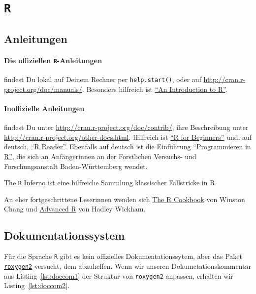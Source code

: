 \documentclass[twoside]{scrreprt}
\providecommand{\R}{\texttt{R}}
\providecommand{\code}[1]{\texttt{#1}}
\providecommand{\BW}{Baden-W\"urttemberg}
\providecommand{\FVA}[1]{Forstliche#1 Versuchs- und Forschungs\-anstalt}
\providecommand{\FVABW}[1]{\FVA{#1} \BW{}}
\begin{document}
\section{\R{}}
\subsection{Anleitungen }
\paragraph{Die offiziellen  \R{}-Anleitungen} findest Du lokal auf Deinem Rechner per
\code{help.start()}, oder auf \url{http://cran.r-project.org/doc/manuals/}.
Besonders hilfreich ist
\linebreak{}
\href{http://cran.r-project.org/doc/manuals/r-release/R-intro.pdf}
{"`An Introduction to R"'}.

\paragraph{Inoffizielle Anleitungen} findest Du unter
\url{http://cran.r-project.org/doc/contrib/}, ihre Beschreibung unter
\url{http://cran.r-project.org/other-docs.html}. Hilfreich ist
\href{http://cran.r-project.org/doc/contrib/Paradis-rdebuts_en.pdf}
{"`R for Beginners"'}
und, auf deutsch,
\href{http://cran.r-project.org/doc/contrib/Grosz+Peters-R-Reader.pdf}
{"`R Reader"'}.
Ebenfalls auf deutsch ist die Einf\"u{}hrung  
\href{http://fvafrcu.github.com/programmieren_in_r}
{"`Programmieren in R"'}, die sich an Anf\"a{}ngerinnen an der \FVABW{n} wendet. 


\href{http://www.burns-stat.com/pages/Tutor/R_inferno.pdf}{The \R{} Inferno} ist
eine hilfreiche Sammlung klassischer Fallstricke in R.

An eher fortgeschrittene Leserinnen wenden sich 
\href{http://www.cookbook-r.com/}{The R Cookbook} von Winston Chang und 
\href{http://adv-r.had.co.nz/}{Advanced R} von Hadley Wickham.


\subsection{Dokumentationssystem}
F\"u{}r die Sprache \R{}
gibt es kein offizielles Dokumentationssytem, aber
das Paket \href{http://cran.r-project.org/web/packages/roxygen2/index.html}
{\code{roxygen2}} versucht, dem abzuhelfen.
Wenn wir unseren Dokumetationskommentar aus Listing~\ref{lst:doccom1} der
Struktur von \code{roxygen2} anpassen, erhalten wir Listing~\ref{lst:doccom2}.
\end{document}

